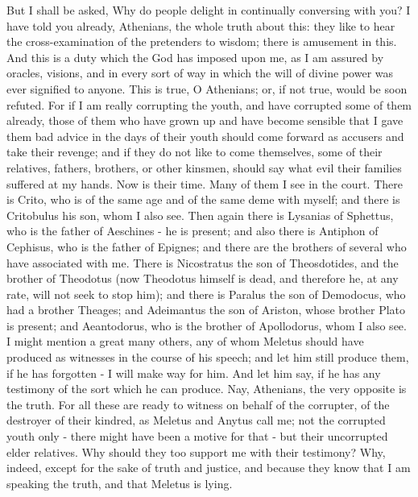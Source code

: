 \documentclass[11pt]{article}
\begin{document}
But I shall be asked, Why do people delight in continually conversing with you? I have told you already, Athenians, the whole truth about this: they like to hear the cross-examination of the pretenders to wisdom; there is amusement in this. And this is a duty which the God has imposed upon me, as I am assured by oracles, visions, and in every sort of way in which the will of divine power was ever signified to anyone. This is true, O Athenians; or, if not true, would be soon refuted. For if I am really corrupting the youth, and have corrupted some of them already, those of them who have grown up and have become sensible that I gave them bad advice in the days of their youth should come forward as accusers and take their revenge; and if they do not like to come themselves, some of their relatives, fathers, brothers, or other kinsmen, should say what evil their families suffered at my hands. Now is their time. Many of them I see in the court. There is Crito, who is of the same age and of the same deme with myself; and there is Critobulus his son, whom I also see. Then again there is Lysanias of Sphettus, who is the father of Aeschines - he is present; and also there is Antiphon of Cephisus, who is the father of Epignes; and there are the brothers of several who have associated with me. There is Nicostratus the son of Theosdotides, and the brother of Theodotus (now Theodotus himself is dead, and therefore he, at any rate, will not seek to stop him); and there is Paralus the son of Demodocus, who had a brother Theages; and Adeimantus the son of Ariston, whose brother Plato is present; and Aeantodorus, who is the brother of Apollodorus, whom I also see. I might mention a great many others, any of whom Meletus should have produced as witnesses in the course of his speech; and let him still produce them, if he has forgotten - I will make way for him. And let him say, if he has any testimony of the sort which he can produce. Nay, Athenians, the very opposite is the truth. For all these are ready to witness on behalf of the corrupter, of the destroyer of their kindred, as Meletus and Anytus call me; not the corrupted youth only - there might have been a motive for that - but their uncorrupted elder relatives. Why should they too support me with their testimony? Why, indeed, except for the sake of truth and justice, and because they know that I am speaking the truth, and that Meletus is lying.
\end{document}
